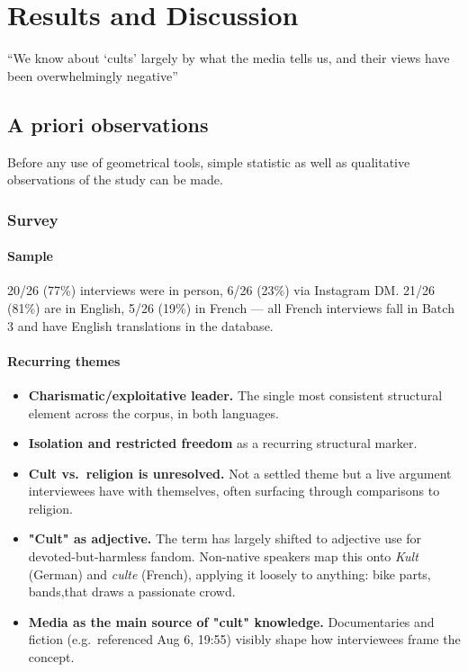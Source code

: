 \chapter{Results and Discussion}

``We know about `cults' largely by what the media tells us, and their views have been overwhelmingly negative\autocite{vandrielPrintMediaCoverage1988, pfeiferPsychologicalFramingCults1992}'' \autocite[pp.1]{dawsonCultsNewReligious2009}


\section{A priori observations}
Before any use of geometrical tools, simple statistic as well as qualitative observations of the study can be made.

\subsection{Survey}

\subsubsection{Sample}
20/26 (77\%) interviews were in person, 6/26 (23\%) via Instagram DM. 21/26 (81\%) are in English, 5/26 (19\%) in French — all French interviews fall in Batch 3 and have English translations in the database.

\subsubsection{Recurring themes}
\begin{itemize}
  \item \textbf{Charismatic/exploitative leader.} The single most consistent structural element across the corpus, in both languages.
  \item \textbf{Isolation and restricted freedom} as a recurring structural marker.
  \item \textbf{Cult vs.\ religion is unresolved.} Not a settled theme but a live argument interviewees have with themselves, often surfacing through comparisons to religion.
  \item \textbf{"Cult" as adjective.} The term has largely shifted to adjective use for devoted-but-harmless fandom. Non-native speakers map this onto \textit{Kult} (German) and \textit{culte} (French), applying it loosely to anything: bike parts, bands,that draws a passionate crowd.
  \item \textbf{Media as the main source of "cult" knowledge.} Documentaries and fiction (e.g.\ referenced Aug 6, 19:55) visibly shape how interviewees frame the concept.
\end{itemize}

